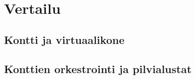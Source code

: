 \chapter{Vertailu\label{comparisons}}

\section{Kontti ja virtuaalikone}

\section{Konttien orkestrointi ja pilvialustat}
